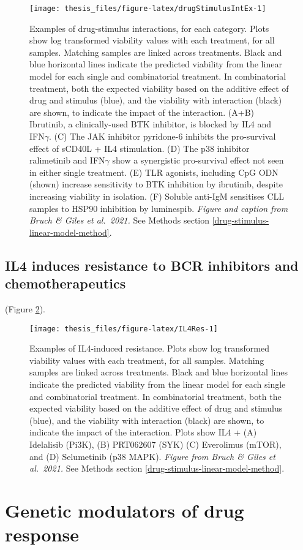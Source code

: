 \documentclass[11pt, a4paper, twosided]{book}
\begin{document}
\begin{figure}

{\centering \texttt{[image: thesis\_files/figure-latex/drugStimulusIntEx-1]} 

}

\caption{Examples of drug-stimulus interactions, for each category. Plots show log transformed viability values with each treatment, for all samples. Matching samples are linked across treatments. Black and blue horizontal lines indicate the predicted viability from the linear model for each single and combinatorial treatment. In combinatorial treatment, both the expected viability based on the additive effect of drug and stimulus (blue), and the viability with interaction (black) are shown, to indicate the impact of the interaction. (A+B) Ibrutinib, a clinically-used BTK inhibitor, is blocked by IL4 and IFN\(\gamma\). (C) The JAK inhibitor pyridone-6 inhibits the pro-survival effect of sCD40L + IL4 stimulation. (D) The p38 inhibitor ralimetinib and IFN\(\gamma\) show a synergistic pro-survival effect not seen in either single treatment. (E) TLR agonists, including CpG ODN (shown) increase sensitivity to BTK inhibition by ibrutinib, despite increasing viability in isolation. (F) Soluble anti-IgM sensitises CLL samples to HSP90 inhibition by luminespib. \emph{Figure and caption from Bruch \& Giles et al.~2021.} See Methods section \ref{drug-stimulus-linear-model-method}.}\label{fig:drugStimulusIntEx}
\end{figure}
\hypertarget{IL4resistance}{%
\subsection{IL4 induces resistance to BCR inhibitors and chemotherapeutics}\label{IL4resistance}}

(Figure \ref{fig:IL4Res}).


\begin{figure}

{\centering \texttt{[image: thesis\_files/figure-latex/IL4Res-1]} 

}

\caption{Examples of IL4-induced resistance. Plots show log transformed viability values with each treatment, for all samples. Matching samples are linked across treatments. Black and blue horizontal lines indicate the predicted viability from the linear model for each single and combinatorial treatment. In combinatorial treatment, both the expected viability based on the additive effect of drug and stimulus (blue), and the viability with interaction (black) are shown, to indicate the impact of the interaction. Plots show IL4 + (A) Idelalisib (Pi3K), (B) PRT062607 (SYK) (C) Everolimus (mTOR), and (D) Selumetinib (p38 MAPK). \emph{Figure from Bruch \& Giles et al.~2021.} See Methods section \ref{drug-stimulus-linear-model-method}.}\label{fig:IL4Res}
\end{figure}
\hypertarget{genetic-modulators-of-drug-response}{%
\section{Genetic modulators of drug response}\label{genetic-modulators-of-drug-response}}
\end{document}
